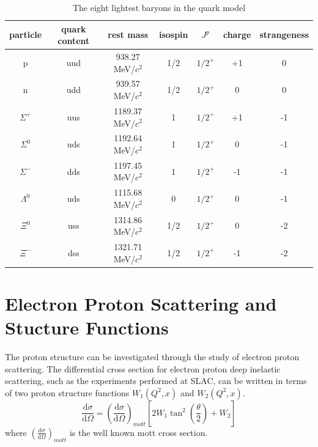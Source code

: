 \documentclass[abstract = on,listof=totoc, bibliography=totoc]{scrreprt}
\begin{document}
\begin{center}
\begin{table}[h!]
\begin{tabular}{|c|c|c|c|c|c|c|} \hline
particle & quark content & rest mass & isospin & $J^p$ & charge & strangeness \\
\hline
p			& uud & 938.27 MeV/$c^2$ 		& 1/2 & $1/2^+$ & +1 & 0  \\
n			& udd & 939.57 MeV/$c^2$		& 1/2 & $1/2^+$ & 0   & 0  \\
$\Sigma^+$	& uus & 1189.37 MeV/$c^2$		& 1    & $1/2^+$ & +1 & -1 \\
$\Sigma^0$	& uds & 1192.64 MeV/$c^2$		& 1    & $1/2^+$ & 0 & -1 \\
$\Sigma^-$	& dds & 1197.45 MeV/$c^2$		& 1    & $1/2^+$ & -1 & -1 \\
$\Lambda^0$	& uds & 1115.68 MeV/$c^2$		& 0    & $1/2^+$ & 0 & -1 \\
$\Xi^0$		& uss & 1314.86 MeV/$c^2$		& 1/2  & $1/2^+$ & 0 & -2 \\
$\Xi^-$		& dss & 1321.71 MeV/$c^2$		& 1/2  & $1/2^+$ & -1 & -2 \\
\hline
\end{tabular}
\caption{The eight lightest baryons in the quark model}
\label{tab:baryontable}
\end{table}
\end{center}



\section{Electron Proton Scattering and Stucture Functions}

The proton structure can be investigated through the study of electron proton scattering. The differential cross section for electron proton deep inelastic scattering, such as the experiments performed at SLAC, can be written in terms of two proton structure functions $W_1(Q^2, x)$ and $W_2(Q^2, x)$.
\begin{equation}
\frac{\text{d}\sigma}{\text{d}\Omega} = \left(\frac{\text{d}\sigma}{\text{d}\Omega}\right)_{mott}\left[2W_1\tan^2\left(\frac{\theta}{2}\right) + W_2\right]
\end{equation}
where $\left(\frac{\text{d}\sigma}{\text{d}\Omega}\right)_{mott}$ is the well known mott cross section.
\end{document}
